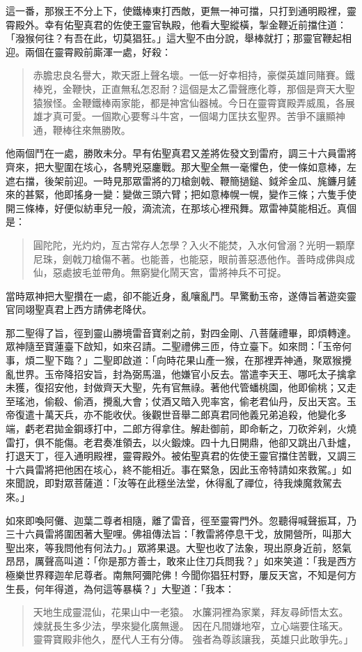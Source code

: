 這一番，那猴王不分上下，使鐵棒東打西敵，更無一神可擋，只打到通明殿裡，靈霄殿外。幸有佑聖真君的佐使王靈官執殿，他看大聖縱橫，掣金鞭近前擋住道：「潑猴何往？有吾在此，切莫猖狂。」這大聖不由分說，舉棒就打；那靈官鞭起相迎。兩個在靈霄殿前廝渾一處，好殺：
\begin{quote}
赤膽忠良名譽大，欺天誑上聲名壞。一低一好幸相持，豪傑英雄同賭賽。鐵棒兇，金鞭快，正直無私怎忍耐？這個是太乙雷聲應化尊，那個是齊天大聖猿猴怪。金鞭鐵棒兩家能，都是神宮仙器械。今日在靈霄寶殿弄威風，各展雄才真可愛。一個欺心要奪斗牛宮，一個竭力匡扶玄聖界。苦爭不讓顯神通，鞭棒往來無勝敗。
\end{quote}

他兩個鬥在一處，勝敗未分。早有佑聖真君又差將佐發文到雷府，調三十六員雷將齊來，把大聖圍在垓心，各騁兇惡鏖戰。那大聖全無一毫懼色，使一條如意棒，左遮右擋，後架前迎。一時見那眾雷將的刀槍劍戟、鞭簡撾鎚、鉞斧金瓜、旄鐮月鏟來的甚緊，他即搖身一變：變做三頭六臂；把如意棒幌一幌，變作三條；六隻手使開三條棒，好便似紡車兒一般，滴流流，在那垓心裡飛舞。眾雷神莫能相近。真個是：
\begin{quote}
圓陀陀，光灼灼，亙古常存人怎學？入火不能焚，入水何曾溺？光明一顆摩尼珠，劍戟刀槍傷不著。也能善，也能惡，眼前善惡憑他作。善時成佛與成仙，惡處披毛並帶角。無窮變化鬧天宮，雷將神兵不可捉。
\end{quote}

當時眾神把大聖攢在一處，卻不能近身，亂嚷亂鬥。早驚動玉帝，遂傳旨著遊奕靈官同翊聖真君上西方請佛老降伏。

那二聖得了旨，徑到靈山勝境雷音寶剎之前，對四金剛、八菩薩禮畢，即煩轉達。眾神隨至寶蓮臺下啟知，如來召請。二聖禮佛三匝，侍立臺下。如來問：「玉帝何事，煩二聖下臨？」二聖即啟道：「向時花果山產一猴，在那裡弄神通，聚眾猴攪亂世界。玉帝降招安旨，封為弼馬溫，他嫌官小反去。當遣李天王、哪吒太子擒拿未獲，復招安他，封做齊天大聖，先有官無祿。著他代管蟠桃園，他即偷桃；又走至瑤池，偷殽、偷酒，攪亂大會；仗酒又暗入兜率宮，偷老君仙丹，反出天宮。玉帝復遣十萬天兵，亦不能收伏。後觀世音舉二郎真君同他義兄弟追殺，他變化多端，虧老君拋金鋼琢打中，二郎方得拿住。解赴御前，即命斬之，刀砍斧剁，火燒雷打，俱不能傷。老君奏准領去，以火鍛煉。四十九日開鼎，他卻又跳出八卦爐，打退天丁，徑入通明殿裡，靈霄殿外。被佑聖真君的佐使王靈官擋住苦戰，又調三十六員雷將把他困在垓心，終不能相近。事在緊急，因此玉帝特請如來救駕。」如來聞說，即對眾菩薩道：「汝等在此穩坐法堂，休得亂了禪位，待我煉魔救駕去來。」

如來即喚阿儺、迦葉二尊者相隨，離了雷音，徑至靈霄門外。忽聽得喊聲振耳，乃三十六員雷將圍困著大聖哩。佛祖傳法旨：「教雷將停息干戈，放開營所，叫那大聖出來，等我問他有何法力。」眾將果退。大聖也收了法象，現出原身近前，怒氣昂昂，厲聲高叫道：「你是那方善士，敢來止住刀兵問我？」如來笑道：「我是西方極樂世界釋迦牟尼尊者。南無阿彌陀佛！今聞你猖狂村野，屢反天宮，不知是何方生長，何年得道，為何這等暴橫？」大聖道：「我本：
\begin{quote}
天地生成靈混仙，花果山中一老猿。
水簾洞裡為家業，拜友尋師悟太玄。
煉就長生多少法，學來變化廣無邊。
因在凡間嫌地窄，立心端要住瑤天。
靈霄寶殿非他久，歷代人王有分傳。
強者為尊該讓我，英雄只此敢爭先。」
\end{quote}

